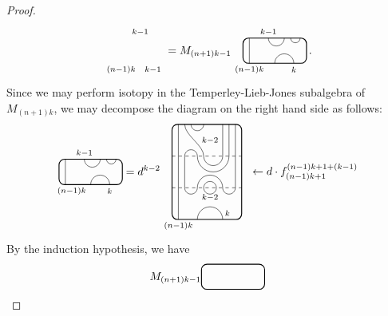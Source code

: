 \documentclass[11pt]{article}
\theoremstyle{plain}
\theoremstyle{definition}
\newcommand{\dave}[1]{\marginpar{\tiny \textcolor{orange}{DP: #1}}}
\begin{document}
\begin{proof}
\begin{align*}
\begin{tikzpicture}[baseline = .3cm]
 \node at (.6,1) {\scriptsize{$k{-}1$}};
 \node at (1,-.2) {\scriptsize{$k{-}1$}};
 \node at (0,-.2) {\scriptsize{$(n{-}1)k$}};
\end{tikzpicture}
=
M_{(n+1)k-1} 
\begin{tikzpicture}[baseline = .3cm]
 \draw[thick, rounded corners = 5pt] (0,0) rectangle (2,.8);
 \draw (.2,0) -- (.2,.8);
 \draw (.8,.8) arc (-180:0:.25cm);
 \draw (1.5,.8) arc (-180:0:.15cm);
 \draw (1,0) arc (180:0:.3cm);
 \node at (.8,1) {\scriptsize{$k{-}1$}};
 \node at (1.6,-.2) {\scriptsize{$k$}};
 \node at (.2,-.2) {\scriptsize{$(n{-}1)k$}};
\end{tikzpicture}
\,.
\end{align*}
Since we may perform isotopy in the Temperley-Lieb-Jones subalgebra of $M_{(n+1)k}$, we may decompose the diagram on the right hand side as follows:
$$
\begin{tikzpicture}[baseline = .3cm]
 \draw[thick, rounded corners = 5pt] (0,0) rectangle (2,.8);
 \draw (.2,0) -- (.2,.8);
 \draw (.8,.8) arc (-180:0:.25cm);
 \draw (1.5,.8) arc (-180:0:.15cm);
 \draw (1,0) arc (180:0:.3cm);
 \node at (.8,1) {\scriptsize{$k{-}1$}};
 \node at (1.6,-.2) {\scriptsize{$k$}};
 \node at (.4,-.2) {\scriptsize{$(n{-}1)k$}};
\end{tikzpicture}
=
d^{k-2}
\begin{tikzpicture}[baseline = 1.4cm]
 \draw[thick, rounded corners = 5pt] (0,0) rectangle (2.2,3);
 \draw (.2,0) -- (.2,3);
 \draw (.6,3) arc (-180:0:.2cm);
 \draw (.4,3) .. controls ++(270:.35cm) and ++(90:.35cm) .. (1,2) arc (-180:0:.3cm) -- (1.6,3);
 \draw (1.8,3) -- (1.8,2) arc (0:-180:.5cm) arc (0:180:.2cm) -- (.4,1) arc (-180:0:.2cm) arc (180:0:.4cm) arc (-180:0:.2cm) -- (2,3);
 \draw (1.2,1) circle (.2cm);
 \draw (.8,0) arc (180:0:.4cm);
 \draw[dashed] (0,1) -- (2.2,1);
 \draw[dashed] (0,2) -- (2.2,2);
 \node at (1.2,.7) {\scriptsize{$k{-}2$}};
 \node at (1.2,2.5) {\scriptsize{$k{-}2$}};
 \node at (1.75,.2) {\scriptsize{$k$}};
 \node at (.2,-.2) {\scriptsize{$(n{-}1)k$}};
%
 \node at (4.2,1.5) {$\leftarrow d\cdot f^{(n-1)k+1+(k-1)}_{(n-1)k+1}$};
\end{tikzpicture}
$$
By the induction hypothesis, we have
$$
M_{(n+1)k-1}
\begin{tikzpicture}[baseline = .3cm]
 \draw[thick, rounded corners = 5pt] (0,0) rectangle (2,.8);

\end{tikzpicture}$$
\end{proof}
\end{document}
